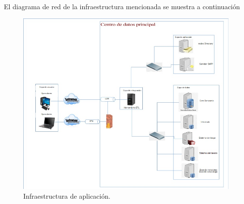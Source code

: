 El diagrama de red de la infraestructura mencionada se muestra a continuación

\begin{figure}[htb]
  \begin{center}
    \includegraphics[width=0.8\linewidth]{Infraestructura.jpg}
    \caption{Infraestructura de aplicación.}
    \label{fig:infraestructura}
  \end{center}
\end{figure}   

\cleardoublepage


